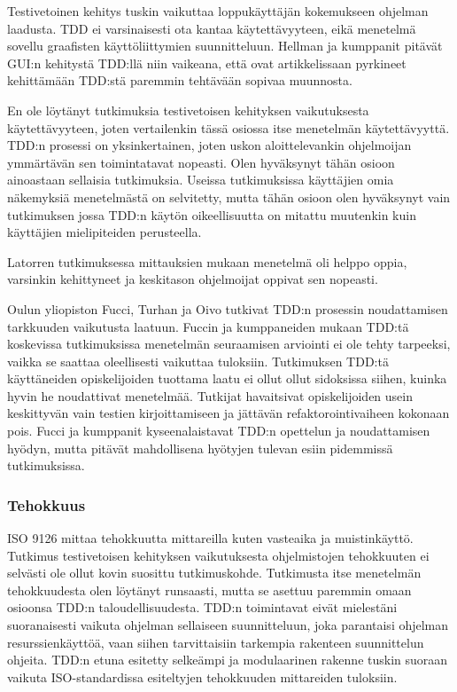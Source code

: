 \documentclass[finnish]{tktltiki2}
\theoremstyle{definition}
\theoremstyle{remark}
\begin{document}
Testivetoinen kehitys tuskin vaikuttaa loppukäyttäjän kokemukseen ohjelman laadusta. TDD ei varsinaisesti ota kantaa käytettävyyteen, eikä menetelmä sovellu graafisten käyttöliittymien suunnitteluun. Hellman ja kumppanit \cite{Hellman10} pitävät GUI:n kehitystä TDD:llä niin vaikeana, että ovat artikkelissaan pyrkineet kehittämään TDD:stä paremmin tehtävään sopivaa muunnosta.

En ole löytänyt tutkimuksia testivetoisen kehityksen vaikutuksesta käytettävyyteen, joten vertailenkin tässä osiossa itse menetelmän käytettävyyttä. TDD:n prosessi on yksinkertainen, joten uskon aloittelevankin ohjelmoijan ymmärtävän sen toimintatavat nopeasti. Olen hyväksynyt tähän osioon ainoastaan sellaisia tutkimuksia. Useissa tutkimuksissa käyttäjien omia näkemyksiä menetelmästä on selvitetty, mutta tähän osioon olen hyväksynyt vain tutkimuksen jossa TDD:n käytön oikeellisuutta on mitattu muutenkin kuin käyttäjien mielipiteiden perusteella.

Latorren \cite{Latorre14} tutkimuksessa mittauksien mukaan menetelmä oli helppo oppia, varsinkin kehittyneet ja keskitason ohjelmoijat oppivat sen nopeasti.

Oulun yliopiston Fucci, Turhan ja Oivo \cite{Fucci14} tutkivat TDD:n prosessin noudattamisen tarkkuuden vaikutusta laatuun. Fuccin ja kumppaneiden mukaan TDD:tä koskevissa tutkimuksissa menetelmän seuraamisen arviointi ei ole tehty tarpeeksi, vaikka se saattaa oleellisesti vaikuttaa tuloksiin. Tutkimuksen TDD:tä käyttäneiden opiskelijoiden tuottama laatu ei ollut ollut sidoksissa siihen, kuinka hyvin he noudattivat menetelmää. Tutkijat havaitsivat opiskelijoiden usein keskittyvän vain testien kirjoittamiseen ja jättävän refaktorointivaiheen kokonaan pois. Fucci ja kumppanit kyseenalaistavat TDD:n opettelun ja noudattamisen hyödyn, mutta pitävät mahdollisena hyötyjen tulevan esiin pidemmissä tutkimuksissa.

\subsubsection{Tehokkuus}

ISO 9126 mittaa tehokkuutta mittareilla kuten vasteaika ja muistinkäyttö. Tutkimus testivetoisen kehityksen vaikutuksesta ohjelmistojen tehokkuuten ei selvästi ole ollut kovin suosittu tutkimuskohde. Tutkimusta itse menetelmän tehokkuudesta olen löytänyt runsaasti, mutta se asettuu paremmin omaan osioonsa TDD:n taloudellisuudesta. TDD:n toimintavat eivät mielestäni suoranaisesti vaikuta ohjelman sellaiseen suunnitteluun, joka parantaisi ohjelman resurssienkäyttöä, vaan siihen tarvittaisiin tarkempia rakenteen suunnittelun ohjeita. TDD:n etuna esitetty selkeämpi ja modulaarinen rakenne tuskin suoraan vaikuta ISO-standardissa esiteltyjen tehokkuuden mittareiden tuloksiin.
\end{document}
